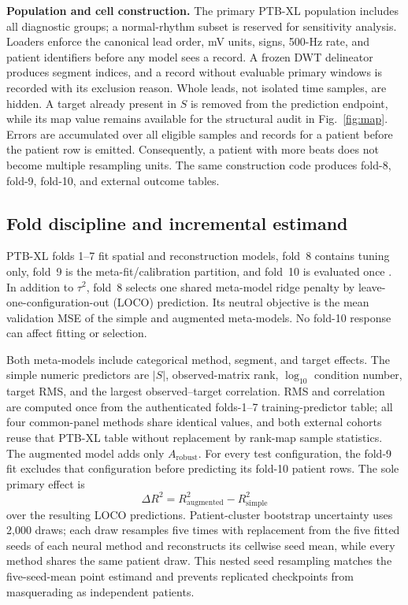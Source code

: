 \documentclass{article}
\begin{document}
\noindent\textbf{Population and cell construction.}  The primary PTB-XL population includes all
diagnostic groups; a normal-rhythm subset is reserved for sensitivity analysis.  Loaders enforce
the canonical lead order, mV units, signs, 500-Hz rate, and patient identifiers before any model
sees a record.  A frozen DWT delineator \cite{makowski2021neurokit} produces segment indices, and a
record without evaluable primary windows is recorded with its exclusion reason.  Whole leads, not
isolated time samples, are hidden.  A target already present in $S$ is removed from the prediction
endpoint, while its map value remains available for the structural audit in Fig.~\ref{fig:map}.
Errors are accumulated over all eligible samples and records for a patient before the patient row
is emitted.  Consequently, a patient with more beats does not become multiple resampling units.
The same construction code produces fold-8, fold-9, fold-10, and external outcome tables.

\subsection{Fold discipline and incremental estimand}
PTB-XL folds 1--7 fit spatial and reconstruction models, fold~8 contains tuning only, fold~9 is the
meta-fit/calibration partition, and fold~10 is evaluated once \cite{wagner2020ptbxl}.  In addition
to $\tau^2$, fold~8 selects one shared meta-model ridge penalty by leave-one-configuration-out
(LOCO) prediction.  Its neutral objective is the mean validation MSE of the simple and augmented
meta-models.  No fold-10 response can affect fitting or selection.

Both meta-models include categorical method, segment, and target effects.  The simple numeric
predictors are $|S|$, observed-matrix rank, $\log_{10}$ condition number, target RMS, and the largest
observed--target correlation.  RMS and correlation are computed once from the authenticated
folds-1--7 training-predictor table; all four common-panel methods share identical values, and both
external cohorts reuse that PTB-XL table without replacement by rank-map sample statistics.  The
augmented model adds only $A_{\mathrm{robust}}$.  For every test
configuration, the fold-9 fit excludes that configuration before predicting its fold-10 patient
rows.  The sole primary effect is
\begin{equation}
 \Delta R^2=R^2_{\mathrm{augmented}}-R^2_{\mathrm{simple}}
 \label{eq:delta}
\end{equation}
over the resulting LOCO predictions.  Patient-cluster bootstrap uncertainty uses 2,000 draws; each
draw resamples five times with replacement from the five fitted seeds of each neural method and
reconstructs its cellwise seed mean, while every method shares the same patient draw.  This nested
seed resampling matches the five-seed-mean point estimand and prevents replicated checkpoints from
masquerading as independent patients.
\end{document}
